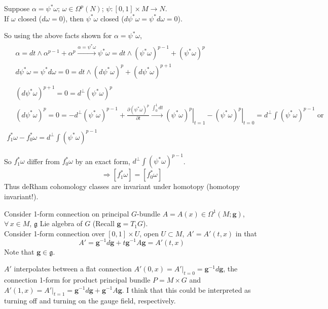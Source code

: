 \documentclass[10pt]{amsart}
\begin{document}
Suppose $\alpha = \psi^* \omega$; $\omega \in \Omega^p(N)$; $\psi : [0,1] \times M \to N$.  \\
If $\omega$ closed ($d\omega =0$), then $\psi^*\omega$ closed ($d\psi^* \omega = \psi^* d\omega =0$).  

So using the above facts shown for $\alpha = \psi^* \omega$,
\[
\begin{gathered}
\begin{aligned}
  & \alpha = dt \wedge \alpha^{p-1} + \alpha^p \xrightarrow{ \alpha = \psi^* \omega } \psi^* \omega = dt \wedge (\psi^* \omega)^{p-1} + (\psi^* \omega)^p \\ 
  &  d\psi^* \omega = \psi^* d\omega = 0 = dt \wedge (d\psi^* \omega)^p + (d\psi^* \omega)^{p+1}
\end{aligned} \\
\begin{aligned}
  &  (d\psi^* \omega)^{p+1} =0 = d^{\perp}(\psi^* \omega)^p \\ 
  & (d\psi^* \omega)^p = 0 = -d^{\perp}(\psi^* \omega)^{p-1} + \frac{ \partial ( \psi^* \omega)^p }{ \partial t} \xrightarrow{ \int_0^1 dt } \left. (\psi^* \omega)^p \right|_{t=1} - \left. (\psi^* \omega)^p \right|_{t=0} = d^{\perp} \int(\psi^* \omega)^{p-1} \text{ or } 
\end{aligned} \\
f_1^* \omega - f_0^* \omega = d^{\perp} \int (\psi^* \omega)^{p-1}
\end{gathered}
\]

So $f_1^* \omega$ differ from $f_0^* \omega$ by an exact form, $d^{\perp} \int(\psi^* \omega)^{p-1}$.  
\[
\Longrightarrow [f_1^* \omega] = [f_0^* \omega]
\]
Thus deRham cohomology classes are invariant under homotopy (homotopy invariant!).  

Consider 1-form connection on principal $G$-bundle $A=A(x) \in \Omega^1(M;\mathbf{g})$, $\forall \, x \in M$, $\mathfrak{g}$ Lie algebra of $G$ (Recall $\mathbf{g} = T_1G$).  \\
Consider 1-form connection over $[0,1] \times U$, open $U \subset M$, $A'=A'(t,x)$ in that
\[
A' = \mathbf{g}^{-1}d\mathbf{g} + t\mathbf{g}^{-1} A \mathbf{g} = A'(t,x)
\]
Note that $\mathbf{g} \in \mathfrak{g}$.  

$A'$ interpolates between a flat connection $A'(0,x) = \left. A' \right|_{t=0} = \mathbf{g}^{-1} d\mathbf{g}$, the connection 1-form for product principal bundle $P=M\times G$ and $A'(1,x) = \left. A'\right|_{t=1} = \mathbf{g}^{-1} d\mathbf{g} + \mathbf{g}^{-1} A \mathbf{g}$.  I think that this could be interpreted as turning off and turning on the gauge field, respectively.  
\end{document}
